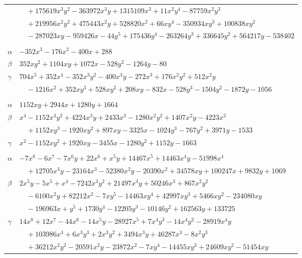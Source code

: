 \documentclass[11pt]{article}
\begin{document}
\begin{longtable}{@{}ll@{}}
 & $\quad +175619x^{3}y^{2}-363972x^{3}y+1315109x^{3}+11x^{2}y^{4}-87759x^{2}y^{3}$\\
 & $\quad +219956x^{2}y^{2}+475443x^{2}y+528820x^{2}+66xy^{4}-350934xy^{3}+100838xy^{2}$\\
 & $\quad -287023xy-959426x-44y^{5}+175436y^{4}-263264y^{3}+336645y^{2}+564217y-538402$\\
\addlinespace[3pt]
\multicolumn{2}{@{}l}{$\{i,j\}=\{29,210\}$, $k_{ij}=2^{4}\cdot 7^{2}$}\\
$\alpha$ & $-352x^{3}-176x^{2}-400x+288$\\
$\beta$ & $352xy^{2}+1104xy+1072x-528y^{2}-1264y-80$\\
$\gamma$ & $704x^{5}+352x^{4}-352x^{3}y^{2}-400x^{3}y-272x^{3}+176x^{2}y^{2}+512x^{2}y$\\
 & $\quad -1216x^{2}+352xy^{3}+528xy^{2}+208xy-832x-528y^{3}-1504y^{2}-1872y-1056$\\
\addlinespace[3pt]
\multicolumn{2}{@{}l}{$\{i,j\}=\{30,53\}$, $k_{ij}=2^{9}\cdot 3$}\\
$\alpha$ & $1152xy+2944x+1280y+1664$\\
$\beta$ & $x^{4}-1152x^{3}y^{2}+4224x^{3}y+2433x^{3}-1280x^{2}y^{2}+1407x^{2}y-4223x^{2}$\\
 & $\quad +1152xy^{3}-1920xy^{2}+897xy-3325x-1024y^{3}-767y^{2}+3971y-1533$\\
$\gamma$ & $x^{2}-1152xy^{2}+1920xy-3455x-1280y^{2}+1152y-1663$\\
\addlinespace[3pt]
\multicolumn{2}{@{}l}{$\{i,j\}=\{31,32\}$, $k_{ij}=2^{7}\cdot 3^{4}\cdot 7$}\\
$\alpha$ & $-7x^{8}-6x^{7}-7x^{6}y+22x^{6}+x^{5}y+14467x^{5}+14463x^{4}y-51998x^{4}$\\
 & $\quad +12705x^{3}y-23164x^{3}-52380x^{2}y-20390x^{2}+34578xy+100247x+9832y+1069$\\
$\beta$ & $2x^{5}y-5x^{5}+x^{4}-7242x^{3}y^{2}+21497x^{3}y+50246x^{3}+867x^{2}y^{2}$\\
 & $\quad -6100x^{2}y+82212x^{2}-7xy^{5}-14463xy^{4}+42997xy^{3}+5466xy^{2}-234080xy$\\
 & $\quad -196963x+y^{5}+1730y^{4}-12205y^{3}-10146y^{2}+162563y+133725$\\
$\gamma$ & $14x^{8}+12x^{7}-44x^{6}-14x^{5}y-28927x^{5}+7x^{4}y^{3}-14x^{4}y^{2}-28919x^{4}y$\\
 & $\quad +103986x^{4}+6x^{3}y^{3}+2x^{3}y^{2}+3494x^{3}y+46287x^{3}-8x^{2}y^{3}$\\
 & $\quad +36212x^{2}y^{2}-20591x^{2}y-23872x^{2}-7xy^{4}-14455xy^{3}+24609xy^{2}-51454xy$\\

\end{longtable}
\end{document}
